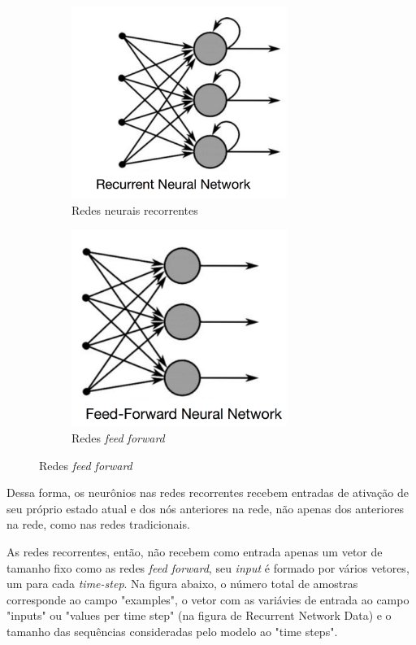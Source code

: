 \begin{figure}[H]
  \centering
  \begin{subfigure}{7cm}
      \centering
      \includegraphics[width=7cm]{../figuras/redes/rnn.png}
      \caption{Redes neurais recorrentes}
      \label{fig:rnn_loops}
  \end{subfigure}
  \hfill
  \begin{subfigure}{7cm}
      \centering
      \includegraphics[width=7cm]{../figuras/redes/ff.png}
      \caption{Redes \textit{feed forward}}
  \end{subfigure}
\end{figure}

Dessa forma, os neurônios nas redes recorrentes recebem entradas de ativação 
de seu próprio estado atual e dos nós anteriores na rede, não apenas dos anteriores
na rede, como nas redes tradicionais.

As redes recorrentes, então, não recebem como entrada apenas um vetor de tamanho 
fixo como as redes \textit{feed forward}, seu \textit{input} é formado 
por vários vetores, um para cada \textit{time-step}. Na figura abaixo, o número
total de amostras corresponde ao campo "examples", o vetor com as 
variávies de entrada ao campo "inputs" ou "values per time step" (na 
figura de Recurrent Network Data) e o tamanho das sequências consideradas
pelo modelo ao "time steps". 

